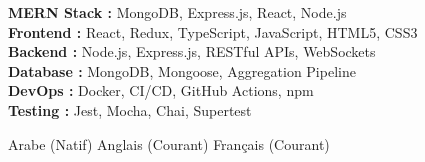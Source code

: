 \documentclass[11pt,a4paper]{article}
\begin{document}
{\small
\textbf{MERN Stack :} MongoDB, Express.js, React, Node.js\\[1.5pt]
\textbf{Frontend :} React, Redux, TypeScript, JavaScript, HTML5, CSS3\\[1.5pt]
\textbf{Backend :} Node.js, Express.js, RESTful APIs, WebSockets\\[1.5pt]
\textbf{Database :} MongoDB, Mongoose, Aggregation Pipeline\\[1.5pt]
\textbf{DevOps :} Docker, CI/CD, GitHub Actions, npm\\[1.5pt]
\textbf{Testing :} Jest, Mocha, Chai, Supertest
}

Arabe (Natif) \textbar{} Anglais (Courant) \textbar{} Français (Courant)

\end{document}
